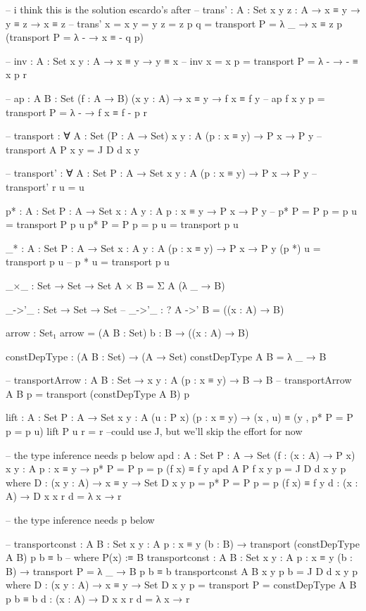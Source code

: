 \documentclass[11pt, a4paper]{article}
\begin{document}
\begin{code}
  -- i think this is the solution escardo's after
  -- trans' : {A : Set} {x y z : A} → x ≡ y → y ≡ z → x ≡ z
  -- trans' {x = x} {y = y} {z = z} p q = transport {P = λ _ → x ≡ z } p (transport {P = λ - → x ≡ - } q p) 

  -- inv : {A : Set} {x y  : A} → x ≡ y → y ≡ x 
  -- inv {x = x} p = transport {P = λ - → - ≡ x} p r

  -- ap : {A B : Set} (f : A → B) (x y : A) → x ≡ y → f x ≡ f y
  -- ap f x y p = transport {P = λ - → f x ≡ f - } p r


  -- transport : ∀ {A : Set} (P : A → Set) {x y : A} (p : x ≡ y)  → P x → P y
  -- transport {A} P {x} {y} = J D d x y

  -- transport' : ∀ {A : Set} {P : A → Set} {x y : A} (p : x ≡ y)  → P x → P y
  -- transport' r u = u


  p* : {A : Set} {P : A → Set} {x : A} {y : A} {p : x ≡ y} → P x → P y
  -- p* {P = P} {p = p} u = transport P p u
  p* {P = P} {p = p} u = transport p u

  _* : {A : Set} {P : A → Set} {x : A} {y : A} (p : x ≡ y) → P x → P y
  (p *) u = transport p u
  -- p * u = transport p u

  _×_ : Set → Set → Set
  A × B = Σ A (λ _ → B)

  _->'_ : Set → Set → Set
  -- _->'_ : ?
  A ->' B = ((x : A) → B)

  arrow : Set₁
  arrow = (A B : Set) {b : B} → ((x : A) → B)

  constDepType : (A B : Set) → (A → Set)
  constDepType A B = λ _ → B
    
  -- transportArrow : {A B : Set} → {x y : A} (p : x ≡ y) → B → B
  -- transportArrow {A} {B} p = transport (constDepType A B) p

  lift : {A : Set} {P : A → Set} {x y : A}  (u : P x) (p : x ≡ y) → (x , u) ≡ (y , p* {P = P} {p = p} u)
  lift {P} u r = r --could use J, but we'll skip the effort for now


  -- the type inference needs p below
  apd : {A : Set} {P : A → Set} (f : (x : A) → P x) {x y : A} {p : x ≡ y}
    → p* {P = P} {p = p} (f x) ≡ f y
  apd {A} {P} f {x} {y} {p} = J D d x y p
    where
      D : (x y : A) → x ≡ y → Set
      D x y p = p* {P = P} {p = p} (f x) ≡ f y
      d : (x : A) → D x x r
      d = λ x → r

  -- the type inference needs p below


  -- transportconst : {A B : Set} {x y : A} {p : x ≡ y} (b : B) → transport (constDepType A B) p b ≡ b
  -- where P(x) :≡ B
  transportconst : {A B : Set} {x y : A} {p : x ≡ y} (b : B) → transport {P = λ _ → B} p b ≡ b
  transportconst {A} {B} {x} {y} {p} b = J D d x y p
    where
      D : (x y : A) → x ≡ y → Set
      D x y p = transport {P = constDepType A B} p b ≡ b
      d : (x : A) → D x x r
      d = λ x → r


\end{code}
\end{document}
